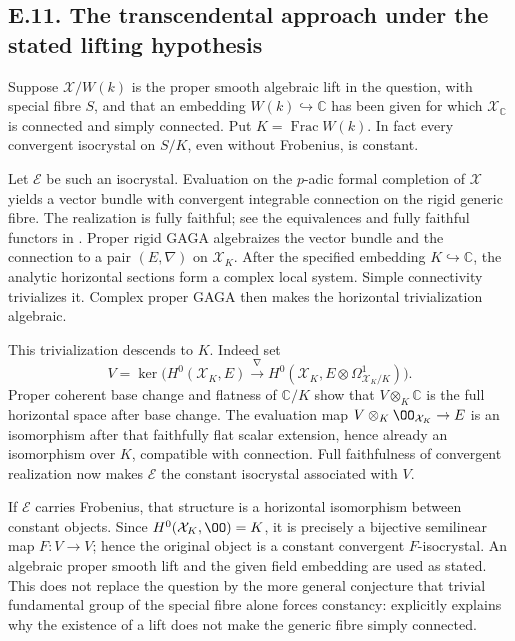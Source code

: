 \subsection{E.11. The transcendental approach under the stated lifting hypothesis}

Suppose $\mathcal X/W(k)$ is the proper smooth algebraic lift in the question, with special fibre $S$, and that an embedding $W(k)\hookrightarrow\mathbb C$ has been given for which $\mathcal X_{\mathbb C}$ is connected and simply connected.  Put $K=\operatorname{Frac}W(k)$.  In fact every convergent isocrystal on $S/K$, even without Frobenius, is constant.

Let $\mathcal E$ be such an isocrystal.  Evaluation on the $p$-adic formal completion of $\mathcal X$ yields a vector bundle with convergent integrable connection on the rigid generic fibre.  The realization is fully faithful; see the equivalences and fully faithful functors in \cite[\S1, (1.13), (1.24)--(1.26)]{EsnaultShiho2018}.  Proper rigid GAGA algebraizes the vector bundle and the connection to a pair $(E,\nabla)$ on $\mathcal X_K$.  After the specified embedding $K\hookrightarrow\mathbb C$, the analytic horizontal sections form a complex local system.  Simple connectivity trivializes it.  Complex proper GAGA then makes the horizontal trivialization algebraic.

This trivialization descends to $K$.  Indeed set
\[
 V=\ker\bigl(H^0(\mathcal X_K,E)\xrightarrow{\nabla}
                H^0(\mathcal X_K,E\otimes\Omega^1_{\mathcal X_K/K})\bigr).
\]
Proper coherent base change and flatness of $\mathbb C/K$ show that $V\otimes_K\mathbb C$ is the full horizontal space after base change.  The evaluation map $V\otimes_K\OO_{\mathcal X_K}\to E$ is an isomorphism after that faithfully flat scalar extension, hence already an isomorphism over $K$, compatible with connection.  Full faithfulness of convergent realization now makes $\mathcal E$ the constant isocrystal associated with $V$.

If $\mathcal E$ carries Frobenius, that structure is a horizontal isomorphism between constant objects.  Since $H^0(\mathcal X_K,\OO)=K$, it is precisely a bijective semilinear map $F:V\to V$; hence the original object is a constant convergent $F$-isocrystal.  An algebraic proper smooth lift and the given field embedding are used as stated.  This does not replace the question by the more general conjecture that trivial \etale fundamental group of the special fibre alone forces constancy: \cite[Introduction]{EsnaultShiho2018} explicitly explains why the existence of a lift does not make the generic fibre simply connected.

